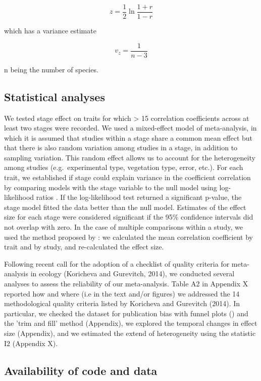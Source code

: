 \documentclass[a4paper]{article}\usepackage[]{graphicx}\usepackage[]{color}
\begin{document}
\[ z = \frac{1}{2} \ln \frac{1+r}{1-r} \]

which has a variance estimate

\[ v_z= \frac{1}{n-3} \]

n being the number of species.

\subsection*{Statistical analyses}\label{statistical-analyses}

We tested stage effect on traits for which > 15 correlation coefficients across at least two stages were recorded. We used a mixed-effect model of meta-analysis, in which it is assumed that studies within a stage share a common mean effect but that there is also random variation among studies in a stage, in addition to sampling variation. This random effect allows us to account for the heterogeneity among studies (e.g.~experimental type, vegetation type, error, etc.). For each trait, we established if stage could explain variance in the coefficient correlation by comparing models with the stage variable to the null model using log-likelihood ratios \citep{Zuur:2009cfa}. If the log-likelihood test returned a significant p-value, the stage model fitted the data better than the null model. Estimates of the effect size for each stage were considered significant if the 95\% confidence intervals did not overlap with zero. In the case of multiple comparisons within a study, we used the method proposed by \citet{Borenstein:2009um}: we calculated the mean correlation coefficient by trait and by study, and re-calculated the effect size. 

Following recent call for the adoption of a checklist of quality criteria for meta-analysis in ecology (Koricheva and Gurevitch, 2014), we conducted several analyses to assess the reliability of our meta-analysis. Table A2 in Appendix X reported how and where (i.e in the text and/or figures) we addressed the 14 methodological quality criteria listed by Koricheva and Gurevitch (2014). In particular, we checked the dataset for publication bias with funnel plots (\citealt{Koricheva:2013tz}) and the 'trim and fill' method (Appendix), we explored the temporal changes in effect size (Appendix), and we estimated the extend of heterogeneity using the statistic I2 (Appendix X). 


\subsection*{Availability of code and data}\label{code}
\end{document}
